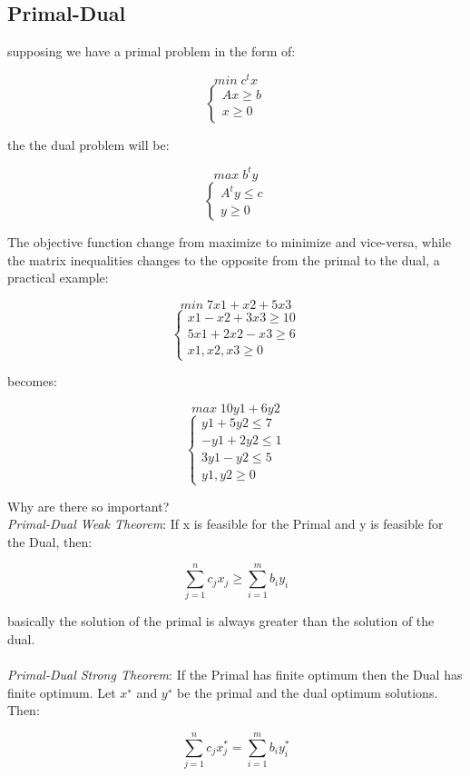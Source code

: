 \documentclass[11pt]{article}
\begin{document}
 \subsection{Primal-Dual}
supposing we have a primal problem in the form of:

  \[min \; c^{t}x\]
 \[\begin{cases} Ax \geq b \\ x \geq 0 \end{cases}\]
 
 the the dual problem will be:
 
 \[max \; b^{t}y\]
 \[\begin{cases} A^{t}y \leq c \\ y \geq 0 \end{cases}\]
 
 The objective function change from maximize to minimize and vice-versa, while the matrix inequalities changes to the opposite from the primal to the dual, a practical example:
 
 \[min \; 7x1 + x2 + 5x3\]
 \[\begin{cases} x1-x2+3x3 \geq 10 \\ 5x1+2x2-x3 \geq 6 \\ x1,x2,x3 \geq 0 \end{cases}\]
 
 becomes:
 
 \[max \; 10y1 + 6y2\]
 \[\begin{cases} y1+5y2 \leq 7 \\ -y1 + 2y2 \leq 1 \\ 3y1-y2 \leq 5 \\y1,y2 \geq 0 \end{cases}\]
 
Why are there so important?\\

\emph{Primal-Dual Weak Theorem}: If x is feasible for the Primal and y is feasible for the Dual, then:

\[ \sum^{n}_{j=1} c_{j}x_{j} \geq \sum^{m}_{i=1}b_{i}y_{i}\]

basically the solution of the primal is always greater than the solution of the dual.\\\\
\emph{Primal-Dual Strong Theorem}: If the Primal has finite optimum then the Dual has finite optimum. Let $x^{∗}$ and $y^{∗}$ be the primal and the dual optimum solutions. Then:

\[ \sum^{n}_{j=1} c_{j}x_{j}^{*} = \sum^{m}_{i=1}b_{i}y_{i}^{*}\]
\end{document}
